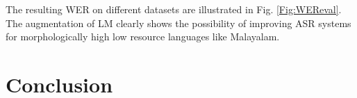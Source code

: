 \documentclass[runningheads]{llncs}
\begin{document}
The resulting WER on different datasets are illustrated in Fig. \ref{Fig:WEReval}. The augmentation of LM clearly shows the possibility of improving ASR systems for morphologically high low resource languages like Malayalam.









\section{Conclusion}
\end{document}
